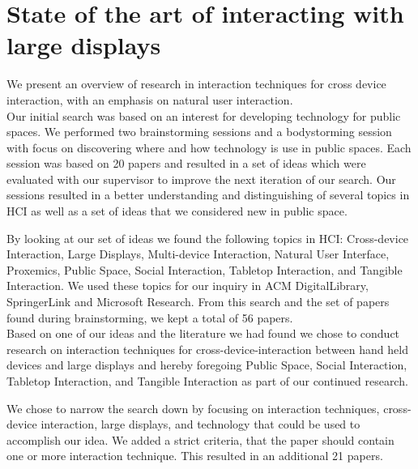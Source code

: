 \section{State of the art of interacting with large displays}
We present an overview of research in interaction techniques for cross device interaction, with an emphasis on natural user interaction.\\

Our initial search was based on an interest for developing technology for public spaces. We performed two brainstorming sessions and a bodystorming session with focus on discovering where and how technology is use in public spaces. Each session was based on 20 papers and  resulted in a set of ideas which were evaluated with our supervisor to improve the next iteration of our search.  Our sessions resulted in a better understanding and distinguishing of several topics in HCI as well as a set of ideas that we considered new in public space.

By looking at our set of ideas we found the following topics in HCI: Cross-device Interaction, Large Displays, Multi-device Interaction, Natural User Interface, Proxemics, Public Space, Social Interaction, Tabletop Interaction, and Tangible Interaction. We used these topics for our inquiry in ACM DigitalLibrary, SpringerLink and Microsoft Research. From this search and the set of papers found during brainstorming, we kept a total of 56 papers.\\ %

Based on one of our ideas and the literature we had found we chose to conduct research on interaction techniques for cross-device-interaction between hand held devices and large displays and hereby foregoing Public Space, Social Interaction, Tabletop Interaction, and Tangible Interaction as part of our continued research.

We chose to narrow the search down by focusing on interaction techniques, cross-device interaction, large displays, and technology that could be used to accomplish our idea. We added a strict criteria, that the paper should contain one or more interaction technique. This resulted in an additional 21 papers.\\ %

